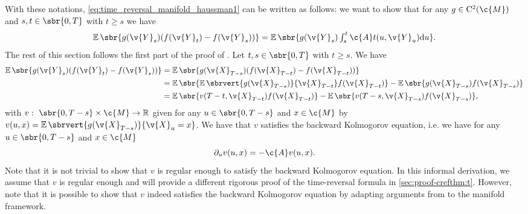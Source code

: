 With these notations, \eqref{eq:time_reversal_manifold_haussman1} can be written as follows: we want to show that for any $g \in \mathrm{C}^2(\c{M})$ and $s, t \in \sbr{0,T}$ with $t \geq s$ we have \begin{equation} \label{eq:time_reversal_manifold_haussman1} \textstyle{\E\sbr{g(\v{Y}_s)(f(\v{Y}_t) - f(\v{Y}_s))} = \E\sbr{g(\v{Y}_s)\int_s^t \c{A}t(u, \v{Y}_u) \mathrm{d} u} .
	}
\end{equation}
The rest of this section follows the first part of the proof of \textcite[Theorem 2.1]{haussmann1986time}.
Let $t, s \in \sbr{0,T}$ with $t \geq s$.
We have \begin{align} \textstyle{\E\sbr{g(\v{Y}_s)(f(\v{Y}_t) - f(\v{Y}_s))}} &= \textstyle{\E\sbr{g(\v{X}_{T-s})(f(\v{X}_{T-t}) - f(\v{X}_{T-t}))}} \\ &= \textstyle{\E\sbr{\E\sbrvert{g(\v{X}_{T-s})}{\v{X}_{T-t}}f(\v{X}_{T-t})} - \E\sbr{g(\v{X}_{T-s})f(\v{X}_{T-s})}} \\ &= \textstyle{\E\sbr{v(T-t,\v{X}_{T-t})f(\v{X}_{T-t})} - \E\sbr{v(T-s,\v{X}_{T-s})f(\v{X}_{T-s})}} , \label{eq:first_der} \end{align} with $v: \ \sbr{0,T-s} \times \c{M} \to \R$ given for any $u \in \sbr{0,T-s}$ and $x \in \c{M}$ by $v(u,x) = \E\sbrvert{g(\v{X}_{T-s})}{\v{X}_u=x}$.
We have that $v$ satisfies the backward Kolmogorov equation, i.e. we have for any $u \in \sbr{0,T-s}$ and $x \in \c{M}$ \begin{equation} \label{eq:backward_kolmogorov} \partial_u v(u,x) = -\c{A} v(u,x) .
\end{equation}
Note that it is not trivial to show that $v$ is regular enough to satisfy the backward Kolmogorov equation.
In this informal derivation, we assume that $v$ is regular enough and will provide a different rigorous proof of the time-reversal formula in \cref{sec:proof-crefthm:t}.
However, note that it is possible to show that $v$ indeed satisfies the backward Kolmogorov equation by adapting arguments from \textcite{haussmann1986time} to the manifold framework.

